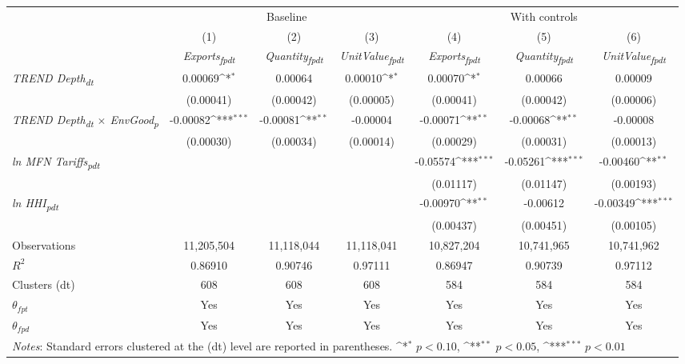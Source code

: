 {
\def\sym#1{\ifmmode^{#1}\else\(^{#1}\)\fi}
\begin{tabular}{l*{6}{c}}
\toprule
&\multicolumn{3}{c}{Baseline}&\multicolumn{3}{c}{With controls}\\\cmidrule(lr){2-4}\cmidrule(lr){5-7}
&(1)&(2)&(3)&(4)&(5)&(6)\\
&\textit{Exports\textsubscript{fpdt}}&\textit{Quantity\textsubscript{fpdt}}&\textit{UnitValue\textsubscript{fpdt}}&\textit{Exports\textsubscript{fpdt}}&\textit{Quantity\textsubscript{fpdt}}&\textit{UnitValue\textsubscript{fpdt}}\\
\midrule
\textit{TREND Depth\textsubscript{dt}} & 0.00069\sym{*} & 0.00064 & 0.00010\sym{*} & 0.00070\sym{*} & 0.00066 & 0.00009\\
 & (0.00041) & (0.00042) & (0.00005) & (0.00041) & (0.00042) & (0.00006)\\
\addlinespace
\textit{TREND Depth\textsubscript{dt} $\times$ EnvGood\textsubscript{p}} & -0.00082\sym{***} & -0.00081\sym{**} & -0.00004 & -0.00071\sym{**} & -0.00068\sym{**} & -0.00008\\
 & (0.00030) & (0.00034) & (0.00014) & (0.00029) & (0.00031) & (0.00013)\\
\addlinespace
\textit{ln MFN Tariffs\textsubscript{pdt}} &  &  &  & -0.05574\sym{***} & -0.05261\sym{***} & -0.00460\sym{**}\\
 &  &  &  & (0.01117) & (0.01147) & (0.00193)\\
\addlinespace
\textit{ln HHI\textsubscript{pdt}} &  &  &  & -0.00970\sym{**} & -0.00612 & -0.00349\sym{***}\\
 &  &  &  & (0.00437) & (0.00451) & (0.00105)\\
\midrule
Observations & 11,205,504 & 11,118,044 & 11,118,041 & 10,827,204 & 10,741,965 & 10,741,962\\
$R^{2}$ & 0.86910 & 0.90746 & 0.97111 & 0.86947 & 0.90739 & 0.97112\\
Clusters (dt) & 608 & 608 & 608 & 584 & 584 & 584\\
$\theta_{fpt}$ & Yes & Yes & Yes & Yes & Yes & Yes\\
$\theta_{fpd}$ & Yes & Yes & Yes & Yes & Yes & Yes\\
\bottomrule
\multicolumn{7}{l}{\footnotesize \textit{Notes}: Standard errors clustered at the (dt) level are reported in parentheses. \sym{*} \(p<0.10\), \sym{**} \(p<0.05\), \sym{***} \(p<0.01\)}\\
\end{tabular}
}
